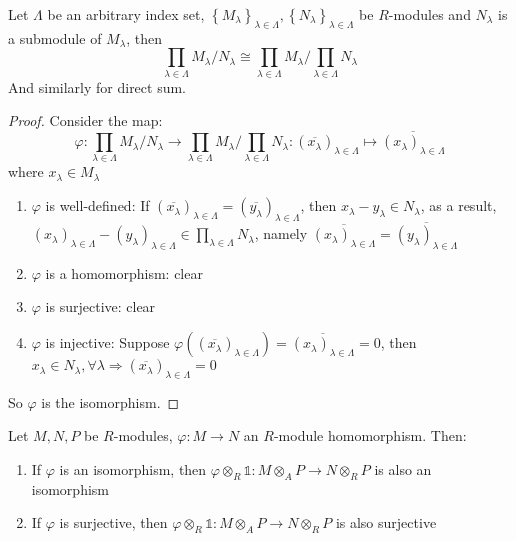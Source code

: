 \documentclass{solution}
\begin{document}
\begin{lemma}
    Let $\Lambda$ be an arbitrary index set, $\left\lbrace M_\lambda \right\rbrace_{\lambda \in \Lambda}, \left\lbrace N_\lambda \right\rbrace_{\lambda \in \Lambda}$ be $R$-modules and $N_\lambda$ is a submodule of $M_\lambda$, then
    $$\prod\limits_{\lambda \in \Lambda} M_\lambda / N_\lambda \cong \prod\limits_{\lambda \in \Lambda} M_{\lambda} / \prod\limits_{\lambda \in \Lambda} N_\lambda$$
    And similarly for direct sum.
\end{lemma}

\begin{proof}
    Consider the map:
    $$\varphi: \prod\limits_{\lambda \in \Lambda} M_\lambda / N_\lambda \rightarrow \prod\limits_{\lambda \in \Lambda} M_{\lambda} / \prod\limits_{\lambda \in \Lambda} N_\lambda: (\overline{x_\lambda})_{\lambda \in \Lambda} \mapsto \overline{(x_\lambda)_{\lambda \in \Lambda}}$$
    where $x_\lambda \in M_\lambda$

    \begin{enumerate}
        \item $\varphi$ is well-defined: If $(\overline{x_\lambda})_{\lambda \in \Lambda} = (\overline{y_\lambda})_{\lambda \in \Lambda}$, then $x_\lambda - y_\lambda \in N_\lambda$, as a result, $(x_\lambda)_{\lambda \in \Lambda} - (y_\lambda)_{\lambda \in \Lambda} \in \prod\limits_{\lambda \in \Lambda}N_\lambda$, namely $\overline{(x_\lambda)_{\lambda \in \Lambda}} = \overline{(y_\lambda)_{\lambda \in \Lambda}}$
        \item $\varphi$ is a homomorphism: clear
        \item $\varphi$ is surjective: clear
        \item $\varphi$ is injective: Suppose $\varphi((\overline{x_{\lambda}})_{\lambda \in \Lambda}) = \overline{(x_\lambda)_{\lambda \in \Lambda}} = 0$, then $x_\lambda \in N_\lambda, \forall \lambda \Rightarrow (\overline{x_\lambda})_{\lambda \in \Lambda} = 0$
    \end{enumerate}

    So $\varphi$ is the isomorphism.
\end{proof}

\begin{proposition}
    Let $M, N, P$ be $R$-modules, $\varphi: M \rightarrow N$ an $R$-module homomorphism. Then:
    \begin{enumerate}
        \item If $\varphi$ is an isomorphism, then $\varphi \otimes_R \mathds{1}: M \otimes_A P \rightarrow N \otimes_R P$ is also an isomorphism
        \item If $\varphi$ is surjective, then $\varphi \otimes_R \mathds{1}: M \otimes_A P \rightarrow N \otimes_R P$ is also surjective
    \end{enumerate}
\end{proposition}
\end{document}
